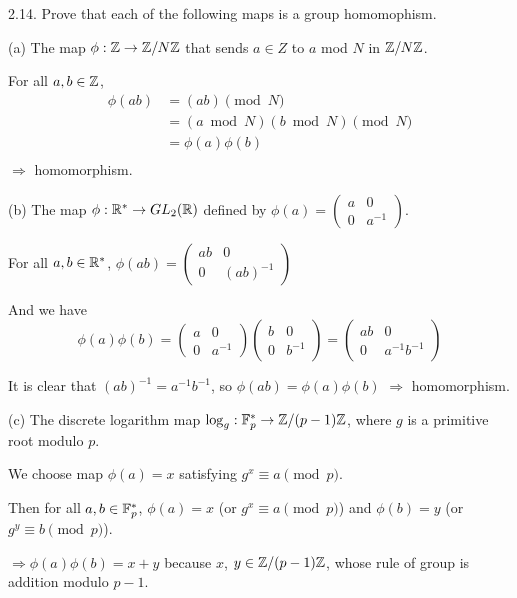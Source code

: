 2.14. Prove that each of the following maps is a group homomophism.

(a) The map $\phi: \mathbb{Z} \rightarrow \mathbb{Z}/N\mathbb{Z}$ that sends $a \in Z$ to $a$ mod $N$ in $\mathbb{Z}/N\mathbb{Z}$.
    
For all $a, b \in \mathbb{Z}$, 
\begin{align*}
    \phi(ab) &= (ab) \pmod N\\
    &= (a \bmod N)(b \bmod N) \pmod N \\
    &= \phi(a)\phi(b) \\ 
\end{align*}
$\Rightarrow$ homomorphism.
    
(b) The map $\phi: \mathbb{R}^* \to GL_2(\mathbb{R})$ defined by $\phi(a) = \begin{pmatrix}a & 0 \\ 0 & a^{-1}\end{pmatrix}$.
    
For all $a, b \in \mathbb{R}^*$, $\phi(ab)=\begin{pmatrix}ab & 0 \\ 0 & (ab)^{-1}\end{pmatrix}$
    
And we have
\begin{equation*}
    \phi(a)\phi(b) = \begin{pmatrix}a & 0 \\ 0 & a^{-1}\end{pmatrix}
    \begin{pmatrix}b & 0 \\ 0 & b^{-1}\end{pmatrix} = 
    \begin{pmatrix}ab & 0 \\ 0 & a^{-1}b^{-1}\end{pmatrix}
\end{equation*}

It is clear that $(ab)^{-1} = a^{-1}b^{-1}$, so $\phi(ab) = \phi(a)\phi(b)$ $\Rightarrow$ homomorphism.
    
(c) The discrete logarithm map $\log_g: \mathbb{F}_p^* \rightarrow \mathbb{Z}/(p-1)\mathbb{Z}$, where $g$ is a primitive root modulo $p$.
    
We choose map $\phi(a) = x$ satisfying $g^x \equiv a \pmod p$.
    
Then for all $a, b \in \mathbb{F}_p^*$, $\phi(a) = x$ (or $g^x \equiv a \pmod p$) and $\phi(b) = y$ (or $g^y \equiv b \pmod p$).

$\Rightarrow \phi(a) \phi(b) = x+y$ because $x$, $y \in \mathbb{Z}/(p-1)\mathbb{Z}$, whose rule of group is addition modulo $p-1$.

